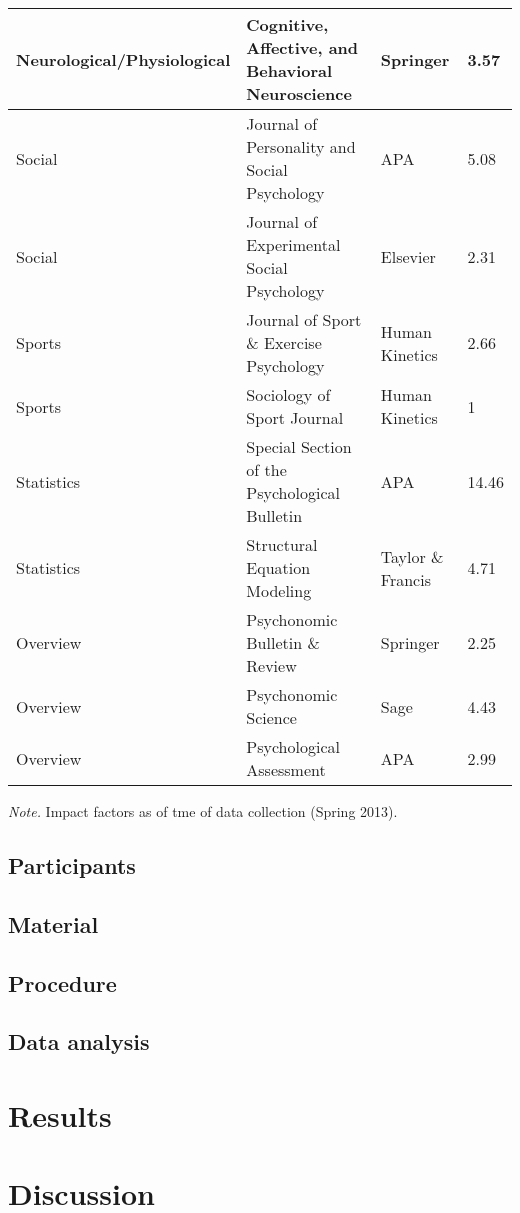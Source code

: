 \documentclass[english,man]{apa6}
\theoremstyle{definition}
\theoremstyle{definition}
\theoremstyle{definition}
\theoremstyle{remark}
\begin{document}
\begin{tabular}{l|l|l|l}
\hline
Neurological/Physiological & Cognitive, Affective, and Behavioral Neuroscience & Springer & 3.57\\
\hline
Social & Journal of Personality and Social Psychology & APA & 5.08\\
\hline
Social & Journal of Experimental Social Psychology & Elsevier & 2.31\\
\hline
Sports & Journal of Sport \& Exercise Psychology & Human Kinetics & 2.66\\
\hline
Sports & Sociology of Sport Journal & Human Kinetics & 1\\
\hline
Statistics & Special Section of the Psychological Bulletin & APA & 14.46\\
\hline
Statistics & Structural Equation Modeling & Taylor \& Francis & 4.71\\
\hline
Overview & Psychonomic Bulletin \& Review & Springer & 2.25\\
\hline
Overview & Psychonomic Science & Sage & 4.43\\
\hline
Overview & Psychological Assessment & APA & 2.99\\
\hline
\end{tabular}

\emph{Note.} Impact factors as of tme of data collection (Spring 2013).

\subsection{Participants}\label{participants}

\subsection{Material}\label{material}

\subsection{Procedure}\label{procedure}

\subsection{Data analysis}\label{data-analysis}

\section{Results}\label{results}

\section{Discussion}\label{discussion}
\end{document}
